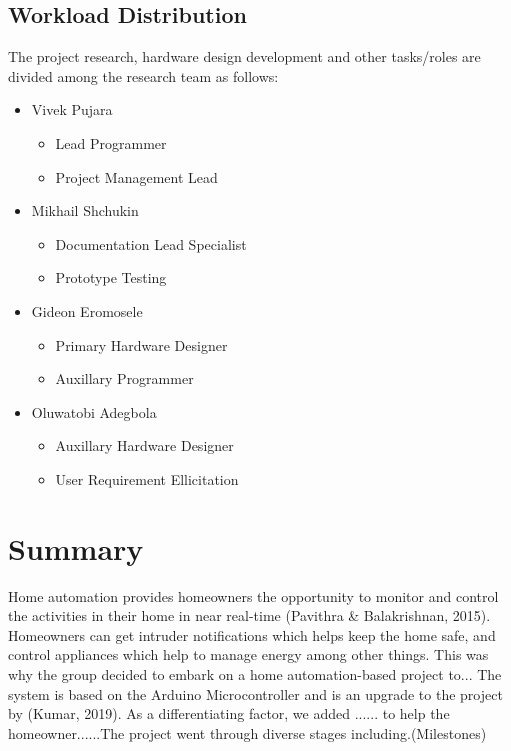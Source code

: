 \documentclass[journal]{IEEEtran}
\begin{document}
\subsection{Workload Distribution}
The project research, hardware design development and other tasks/roles are divided among the research team as follows:
\begin{itemize}
\item{Vivek Pujara}
	\begin{itemize}
	\item{Lead Programmer}
	\item{Project Management Lead}
	\end{itemize}
\item{Mikhail Shchukin}
	\begin{itemize}
	\item{Documentation Lead Specialist}
	\item{Prototype Testing}
	\end{itemize}
\item{Gideon Eromosele}
	\begin{itemize}
	\item{Primary Hardware Designer}
	\item{Auxillary Programmer}
	\end{itemize}
\item{Oluwatobi Adegbola}
	\begin{itemize}
	\item{Auxillary Hardware Designer}
	\item{User Requirement Ellicitation}
	\end{itemize}
\end{itemize}


\section{Summary}
Home automation provides homeowners the opportunity to monitor and control the activities in their home in near real-time (Pavithra & Balakrishnan, 2015). Homeowners can get intruder notifications which helps keep the home safe, and control appliances which help to manage energy among other things. This was why the group decided to embark on a home automation-based project to... The system is based on the Arduino Microcontroller and is an upgrade to the project by (Kumar, 2019). As a differentiating factor, we added ...... to help the homeowner......The project went through diverse stages including.(Milestones)


\ifCLASSOPTIONcaptionsoff
  \newpage
\fi
\end{document}
